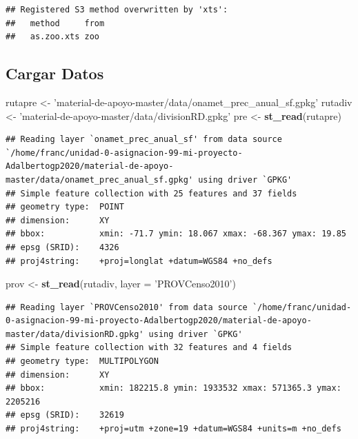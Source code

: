 \documentclass[11pt,]{article}
\newenvironment{Shaded}{\begin{snugshade}}{\end{snugshade}}
\newcommand{\KeywordTok}[1]{\textcolor[rgb]{0.13,0.29,0.53}{\textbf{#1}}}
\newcommand{\DataTypeTok}[1]{\textcolor[rgb]{0.13,0.29,0.53}{#1}}
\newcommand{\StringTok}[1]{\textcolor[rgb]{0.31,0.60,0.02}{#1}}
\newcommand{\NormalTok}[1]{#1}
\begin{document}
\begin{verbatim}
## Registered S3 method overwritten by 'xts':
##   method     from
##   as.zoo.xts zoo
\end{verbatim}

\subsection{Cargar Datos}\label{cargar-datos}

\begin{Shaded}
\begin{Highlighting}[]
\NormalTok{rutapre <-}\StringTok{ 'material-de-apoyo-master/data/onamet_prec_anual_sf.gpkg'}
\NormalTok{rutadiv <-}\StringTok{ 'material-de-apoyo-master/data/divisionRD.gpkg'}
\NormalTok{pre <-}\StringTok{ }\KeywordTok{st_read}\NormalTok{(rutapre)}
\end{Highlighting}
\end{Shaded}

\begin{verbatim}
## Reading layer `onamet_prec_anual_sf' from data source `/home/franc/unidad-0-asignacion-99-mi-proyecto-Adalbertogp2020/material-de-apoyo-master/data/onamet_prec_anual_sf.gpkg' using driver `GPKG'
## Simple feature collection with 25 features and 37 fields
## geometry type:  POINT
## dimension:      XY
## bbox:           xmin: -71.7 ymin: 18.067 xmax: -68.367 ymax: 19.85
## epsg (SRID):    4326
## proj4string:    +proj=longlat +datum=WGS84 +no_defs
\end{verbatim}

\begin{Shaded}
\begin{Highlighting}[]
\NormalTok{prov <-}\StringTok{ }\KeywordTok{st_read}\NormalTok{(rutadiv, }\DataTypeTok{layer =} \StringTok{'PROVCenso2010'}\NormalTok{)}
\end{Highlighting}
\end{Shaded}

\begin{verbatim}
## Reading layer `PROVCenso2010' from data source `/home/franc/unidad-0-asignacion-99-mi-proyecto-Adalbertogp2020/material-de-apoyo-master/data/divisionRD.gpkg' using driver `GPKG'
## Simple feature collection with 32 features and 4 fields
## geometry type:  MULTIPOLYGON
## dimension:      XY
## bbox:           xmin: 182215.8 ymin: 1933532 xmax: 571365.3 ymax: 2205216
## epsg (SRID):    32619
## proj4string:    +proj=utm +zone=19 +datum=WGS84 +units=m +no_defs
\end{verbatim}
\end{document}
